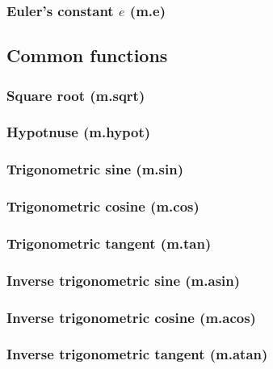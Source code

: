 \documentclass{article}
\theoremstyle{definition}
\begin{document}
\subsubsection{Euler's constant $e$ (m.e)}

\subsection{Common functions}

\subsubsection{Square root (m.sqrt)}

\subsubsection{Hypotnuse (m.hypot)}

\subsubsection{Trigonometric sine (m.sin)}

\subsubsection{Trigonometric cosine (m.cos)}

\subsubsection{Trigonometric tangent (m.tan)}

\subsubsection{Inverse trigonometric sine (m.asin)}

\subsubsection{Inverse trigonometric cosine (m.acos)}

\subsubsection{Inverse trigonometric tangent (m.atan)}
\end{document}
